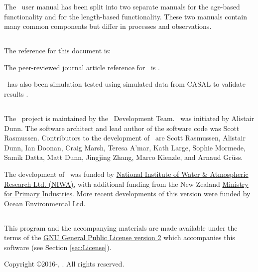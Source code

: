The \CNAME\ user manual has been split into two separate manuals for the age-based functionality and for the length-based functionality. These two manuals contain many common components but differ in processes and observations.

\subsection{}

The reference for this document is: \ManualRef

The peer-reviewed journal article reference for \CNAME\ is \cite{doonan_casal2}.

\CNAME\ has also been simulation tested using simulated data from CASAL to validate results \citep{dunn_integrated_2022}.

\subsection{}

The \CNAME\ project is maintained by the \CNAME\ Development Team. \CNAME\ was initiated by Alistair Dunn. The software architect and lead author of the software code was Scott Rasmussen. Contributors to the development of \CNAME\ are Scott Rasmussen, Alistair Dunn, Ian Doonan, Craig Marsh, Teresa A'mar, Kath Large, Sophie Mormede, Samik Datta, Matt Dunn, Jingjing Zhang, Marco Kienzle, and Arnaud Gr\"{u}ss.

The development of \CNAME\ was funded by \href{http://www.niwa.co.nz}{National Institute of Water \& Atmospheric Research Ltd. (NIWA)}, with additional funding from the New Zealand \href{http://www.mpi.govt.nz}{Ministry for Primary Industries}. More recent developments of this version were funded by Ocean Environmental Ltd.

\subsection{}

This program and the accompanying materials are made available under the terms of the \href{http://www.opensource.org/licenses/GPL-2.0}{GNU General Public License version 2} which accompanies this software (see Section \ref{sec:License}).

Copyright \copyright 2016-\SourceControlYearDoc, \href{https://www.niwa.co.nz}{\Organisation}. All rights reserved.


